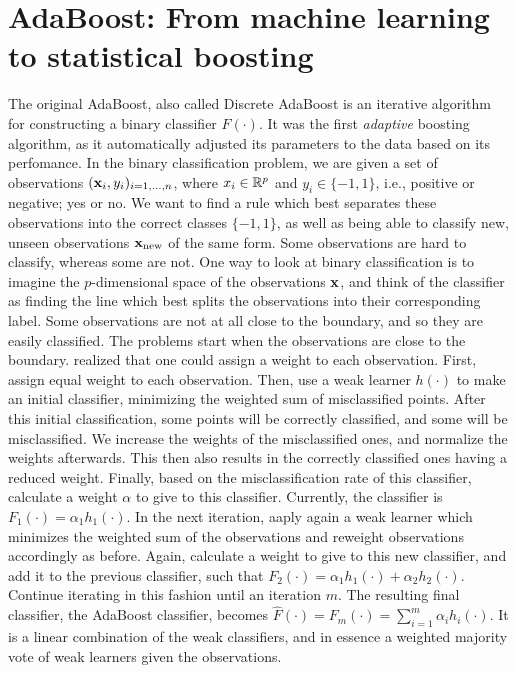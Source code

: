 \section{AdaBoost: From machine learning to statistical boosting}
The original AdaBoost, also called Discrete AdaBoost \citep{adaboost} is an iterative algorithm for constructing a binary classifier $F(\cdot)$. It was the first \textit{adaptive} boosting algorithm, as it automatically adjusted its parameters to the data based on its perfomance. In the binary classification problem, we are given a set of observations $(\mathbf{x}_i,y_i)_{i=1,\ldots,n}$, where $x_i\in\mathbb{R}^p$ and $y_i\in\{-1,1\}$, i.e., positive or negative; yes or no. We want to find a rule which best separates these observations into the correct classes $\{-1,1\}$, as well as being able to classify new, unseen observations $\mathbf{x}_{\text{new}}$ of the same form. Some observations are hard to classify, whereas some are not. One way to look at binary classification is to imagine the $p$-dimensional space of the observations $\mathbf{x}$, and think of the classifier as finding the line which best splits the observations into their corresponding label. Some observations are not at all close to the boundary, and so they are easily classified. The problems start when the observations are close to the boundary. \citet{adaboost} realized that one could assign a weight to each observation. First, assign equal weight to each observation. Then, use a weak learner $h(\cdot)$ to make an initial classifier, minimizing the weighted sum of misclassified points. After this initial classification, some points will be correctly classified, and some will be misclassified. We increase the weights of the misclassified ones, and normalize the weights afterwards. This then also results in the correctly classified ones having a reduced weight. Finally, based on the misclassification rate of this classifier, calculate a weight $\alpha$ to give to this classifier. Currently, the classifier is $F_1(\cdot)=\alpha_1h_1(\cdot).$ In the next iteration, aaply again a weak learner which minimizes the weighted sum of the observations and reweight observations accordingly as before. Again, calculate a weight to give to this new classifier, and add it to the previous classifier, such that $F_2(\cdot)=\alpha_1h_1(\cdot)+\alpha_2h_2(\cdot)$. Continue iterating in this fashion until an iteration $m$. The resulting final classifier, the AdaBoost classifier, becomes $\hat{F}(\cdot)=F_m(\cdot)=\sum_{i=1}^m\alpha_ih_i(\cdot)$. It is a linear combination of the weak classifiers, and in essence a weighted majority vote of weak learners given the observations.

